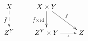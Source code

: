 \documentclass[12pt]{article}
\begin{document}
\pagestyle{empty}

\begin{align*}
  \vcenter{\xymatrix{
    X
    \ar@{-->}[d]_{\bar{f}}
    &
    X \times Y
    \ar@{->}[d]_{\bar{f} \times \mathrm{id}}
    \ar@{->}[rd]^{f}
    \\
    Z^Y
    &
    Z^Y \times Y
    \ar@{->}[r]_-{\epsilon}
    &
    Z
  }}
\end{align*}
\end{document}
